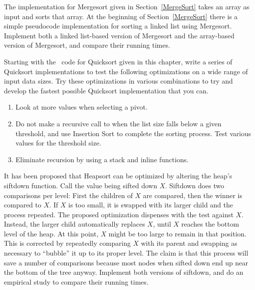 \begin{projects}
\item
The implementation for Mergesort given in Section~\ref{MergeSort}
takes an array as input and sorts that array.
At the beginning of Section~\ref{MergeSort} there is a simple
pseudocode implementation for sorting a linked list using Mergesort.
Implement both a linked list-based version of Mergesort and the
array-based version of Mergesort, and compare their running times.

\item
Starting with the \Lang\ code for Quicksort
given in this chapter,
write a series of Quicksort implementations to test the following
optimizations on a wide range of input data sizes.
Try these optimizations in various combinations to try and develop the
fastest possible Quicksort implementation that you can.

\begin{enumerate}
\item Look at more values when selecting a pivot.

\item Do not make a recursive call to 
when the list size falls below a given threshold, and use
Insertion Sort to complete
the sorting process.
Test various values for the threshold size.

\item Eliminate recursion by using a
stack and inline functions.
\end{enumerate}

\item
{}
It has been proposed that Heapsort can be optimized by altering the
heap's siftdown function.
Call the value being sifted down \(X\).
Siftdown does two comparisons per level: First the children of \(X\)
are compared, then the winner is compared to \(X\).
If \(X\) is too small, it is swapped with its larger child and the
process repeated.
The proposed optimization dispenses with the test against \(X\).
Instead, the larger child automatically replaces \(X\), until \(X\)
reaches the bottom level of the heap.
At this point, \(X\) might be too large to remain in that position.
This is corrected by repeatedly comparing \(X\) with its parent and
swapping as necessary to ``bubble'' it up to its proper level.
The claim is that this process will save a number of comparisons because
most nodes when sifted down end up near the bottom of the tree anyway.
Implement both versions of siftdown, and do an empirical study to
compare their running times.


\end{projects}
